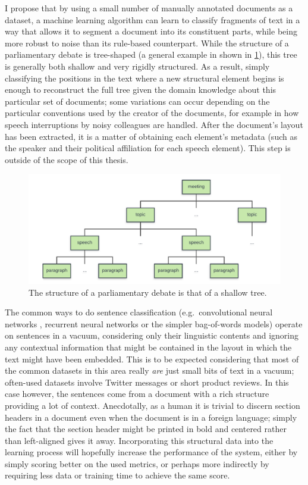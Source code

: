 I propose that by using a small number of manually annotated documents as a
dataset, a machine learning algorithm can learn to classify fragments of text in
a way that allows it to segment a document into its constituent parts, while
being more robust to noise than its rule-based counterpart. While the structure
of a parliamentary debate is tree-shaped (a general example in shown in
\cref{fig:tree}), this tree is generally both shallow and very rigidly
structured. As a result, simply classifying the positions in the text where a
new structural element begins is enough to reconstruct the full tree given the
domain knowledge about this particular set of documents; some variations can
occur depending on the particular conventions used by the creator of the
documents, for example in how speech interruptions by noisy colleagues are
handled. After the document's layout has been extracted, it is a matter of
obtaining each element's metadata (such as the speaker and their political
affiliation for each speech element). This step is outside of the scope of this
thesis.
\begin{figure}[tb]
  \centering
  \includegraphics[width=\textwidth]{figures/tree.pdf}
  \caption{The structure of a parliamentary debate is that of a shallow
    tree.\label{fig:tree}}
\end{figure}

The common ways to do sentence classification (e.g.\ convolutional neural
networks \citep{kim2014conv}, recurrent neural networks or the simpler
bag-of-words models) operate on sentences in a vacuum, considering only their
linguistic contents and ignoring any contextual information that might be
contained in the layout in which the text might have been embedded. This is to
be expected considering that most of the common datasets in this area really
\emph{are} just small bits of text in a vacuum; often-used datasets involve
Twitter messages or short product reviews. In this case however, the sentences
come from a document with a rich structure providing a lot of context.
Anecdotally, as a human it is trivial to discern section headers in a document
even when the document is in a foreign language; simply the fact that the
section header might be printed in bold and centered rather than left-aligned
gives it away.  Incorporating this structural data into the learning process
will hopefully increase the performance of the system, either by simply scoring
better on the used metrics, or perhaps more indirectly by requiring less data or
training time to achieve the same score.

